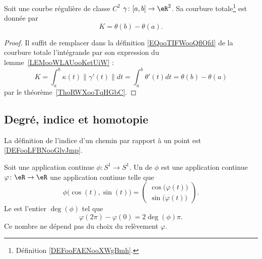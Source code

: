 \begin{lemma}
	Soit une courbe régulière de classe \( C^2\) \( \gamma\colon \mathopen[ a , b \mathclose]\to \eR^2\). Sa courbure totale\footnote{Définition \ref{DEFooFAENooXWgBmh}.} est donnée par
	\begin{equation}
		K=\theta(b)-\theta(a).
	\end{equation}
\end{lemma}

\begin{proof}
	Il suffit de remplacer dans la définition \eqref{EQooTIFWooQflOfd} de la courbure totale l'intégrande par son expression du lemme~\ref{LEMooWLAUooKetUiW} :
	\begin{equation}
		K=\int_a^b\kappa(t)\| \gamma'(t) \|dt=\int_a^b\theta'(t)dt=\theta(b)-\theta(a)
	\end{equation}
	par le théorème~\ref{ThoRWXooTqHGbC}.
\end{proof}

\subsection{Degré, indice et homotopie}

La définition de l'indice d'un chemin par rapport à un point est \ref{DEFooLFBNooGlvJmp}.

\begin{lemmaDef}        \label{DEFooTKBUooNVcheO}
	Soit une application continue \( \phi\colon S^1\to S^1\). Un  de \( \phi\) est une application continue \( \varphi\colon \eR\to \eR\) une application continue telle que
	\begin{equation}
		\phi\big( \cos(t),\sin(t) \big)=\begin{pmatrix}
			\cos\big( \varphi(t) \big) \\
			\sin\big( \varphi(t) \big)
		\end{pmatrix}.
	\end{equation}
	Le  est l'entier \( \deg(\phi)\) tel que
	\begin{equation}
		\varphi(2\pi)-\varphi(0)=2\deg(\phi)\pi.
	\end{equation}
	Ce nombre ne dépend pas du choix du relèvement \( \varphi\).
\end{lemmaDef}

